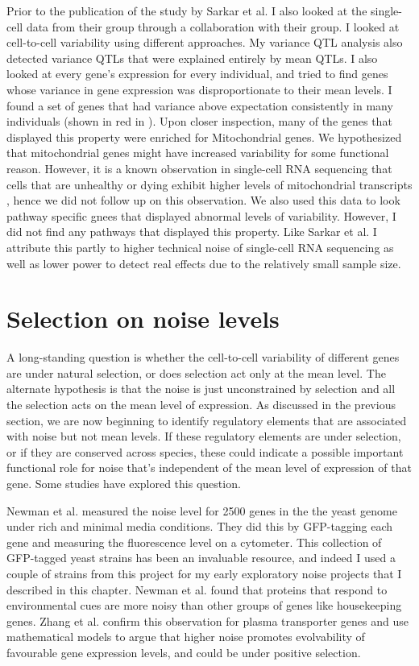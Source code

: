 Prior to the publication of the study by Sarkar et al. I also looked at the single-cell data from their group through a collaboration with their group. I looked at cell-to-cell variability using different approaches. My variance QTL analysis also detected variance QTLs that were explained entirely by mean QTLs. I also looked at every gene's expression for every individual, and tried to find genes whose variance in gene expression was disproportionate to their mean levels. I found a set of genes that had variance above expectation consistently in many individuals (shown in red in \cite{fig:intro_figure1}). Upon closer inspection, many of the genes that displayed this property were enriched for Mitochondrial genes. We hypothesized that mitochondrial genes might have increased variability for some functional reason. However, it is a known observation in single-cell RNA sequencing that cells that are unhealthy or dying exhibit higher levels of mitochondrial transcripts \cite {seurat}, hence we did not follow up on this observation. We also used this data to look pathway specific gnees that displayed abnormal levels of variability. However, I did not find any pathways that displayed this property. Like Sarkar et al. I attribute this partly to higher technical noise of single-cell RNA sequencing as well as lower power to detect real effects due to the relatively small sample size.

\section{Selection on noise levels}

A long-standing question is whether the cell-to-cell variability of different genes are under natural selection, or does selection act only at the mean level. The alternate hypothesis is that the noise is just unconstrained by selection and all the selection acts on the mean level of expression. As discussed in the previous section, we are now beginning to identify regulatory elements that are associated with noise but not mean levels. If these regulatory elements are under selection, or if they are conserved across species, these could indicate a possible important functional role for noise that's independent of the mean level of expression of that gene. Some studies have explored this question.

Newman et al. \cite{Newman} measured the noise level for 2500 genes in the the yeast genome under rich and minimal media conditions. They did this by GFP-tagging each gene and measuring the fluorescence level on a cytometer. This collection of GFP-tagged yeast strains has been an invaluable resource, and indeed I used a couple of strains from this project for my early exploratory noise projects that I described in this chapter. Newman et al. found that proteins that respond to environmental cues are more noisy than other groups of genes like housekeeping genes. Zhang et al. \cite{Zhang} confirm this observation for plasma transporter genes and use mathematical models to argue that higher noise promotes evolvability of favourable gene expression levels, and could be under positive selection. 

